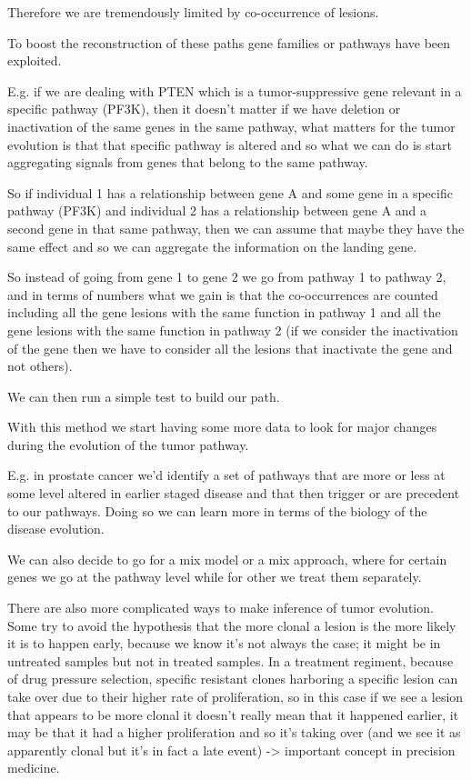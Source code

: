 Therefore we are tremendously limited by co-occurrence of lesions.

To boost the reconstruction of these paths gene families or pathways have been
exploited.

E.g. if we are dealing with PTEN which is a tumor-suppressive gene relevant in a
specific pathway (PF3K), then it doesn't matter if we have deletion or
inactivation of the same genes in the same pathway, what matters for the tumor
evolution is that that specific pathway is altered and so what we can do is
start aggregating signals from genes that belong to the same pathway.

So if individual 1 has a relationship between gene A and some gene in a specific
pathway (PF3K) and individual 2 has a relationship between gene A and a second
gene in that same pathway, then we can assume that maybe they have the same
effect and so we can aggregate the information on the landing gene.

So instead of going from gene 1 to gene 2 we go from pathway 1 to pathway 2, and
in terms of numbers what we gain is that the co-occurrences are counted
including all the gene lesions with the same function in pathway 1 and all the
gene lesions with the same function in pathway 2 (if we consider the
inactivation of the gene then we have to consider all the lesions that
inactivate the gene and not others).

We can then run a simple test to build our path.

With this method we start having some more data to look for major changes during
the evolution of the tumor pathway.

E.g. in prostate cancer we'd identify a set of pathways that are more or less at
some level altered in earlier staged disease and that then trigger or are
precedent to our pathways. Doing so we can learn more in terms of the biology of
the disease evolution.

We can also decide to go for a mix model or a mix approach, where for certain
genes we go at the pathway level while for other we treat them separately.

There are also more complicated ways to make inference of tumor evolution. Some
try to avoid the hypothesis that the more clonal a lesion is the more likely it
is to happen early, because we know it's not always the case; it might be in
untreated samples but not in treated samples. In a treatment regiment, because
of drug pressure selection, specific resistant clones harboring a specific
lesion can take over due to their higher rate of proliferation, so in this case
if we see a lesion that appears to be more clonal it doesn't really mean that it
happened earlier, it may be that it had a higher proliferation and so it's
taking over (and we see it as apparently clonal but it's in fact a late event)
-\textgreater{} important concept in precision medicine.

